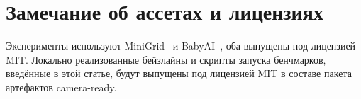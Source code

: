\documentclass{article}
\begin{document}
\section{Замечание об ассетах и лицензиях}
\label{app:assets}

Эксперименты используют MiniGrid~\citep{MinigridMiniworld23} и BabyAI~\citep{chevalier2018babyai}, оба выпущены под лицензией MIT. Локально реализованные бейзлайны и скрипты запуска бенчмарков, введённые в этой статье, будут выпущены под лицензией MIT в составе пакета артефактов camera-ready.

\clearpage
\FloatBarrier

\end{document}
